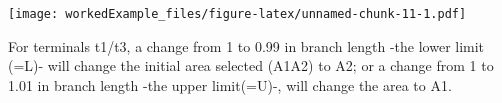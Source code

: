 \documentclass[]{article}
\begin{document}
\texttt{[image: workedExample\_files/figure-latex/unnamed-chunk-11-1.pdf]}

For terminals t1/t3, a change from 1 to 0.99 in branch length -the lower
limit (=L)- will change the initial area selected (A1A2) to A2; or a
change from 1 to 1.01 in branch length -the upper limit(=U)-, will
change the area to A1.
\end{document}
